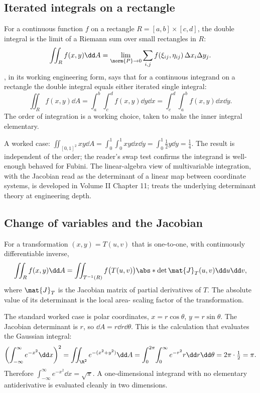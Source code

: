 \subsection{Iterated integrals on a rectangle}

For a continuous function $f$ on a rectangle $R = [a,b] \times
[c,d]$, the double integral is the limit of a Riemann sum over
small rectangles in $R$:
\[
\iint_{R} f(x,y) \dd A = \lim_{\norm{P} \to 0} \sum_{i,j}
f(\xi_{ij}, \eta_{ij}) \, \Delta x_{i} \Delta y_{j}.
\]
, in its working engineering form, says
that for a continuous integrand on a rectangle the double integral
equals either iterated single integral:
\[
\iint_{R} f(x,y) \dd A = \int_{a}^{b}\!\int_{c}^{d} f(x,y) \dd y
\dd x = \int_{c}^{d}\!\int_{a}^{b} f(x,y) \dd x \dd y.
\]
The order of integration is a working choice, taken to make the
inner integral elementary.

A worked case: $\iint_{[0,1]^{2}} x y \dd A = \int_{0}^{1}\!\int_{0}^{1}
x y \dd x \dd y = \int_{0}^{1} \tfrac{1}{2} y \dd y = \tfrac{1}{4}$.
The result is independent of the order; the reader's swap test
confirms the integrand is well-enough behaved for Fubini. The
linear-algebra view of multivariable integration, with the Jacobian
read as the determinant of a linear map between coordinate systems,
is developed in Volume II Chapter 11; \textcite{text:strang2016}
treats the underlying determinant theory at engineering depth.

\subsection{Change of variables and the Jacobian}

For a transformation $(x, y) = T(u, v)$ that is one-to-one, with
continuously differentiable inverse,
\[
\iint_{R} f(x, y) \dd A = \iint_{T^{-1}(R)} f\bigl(T(u,v)\bigr)
\abs*{\det \mat{J}_{T}(u,v)} \dd u \dd v,
\]
where $\mat{J}_{T}$ is the Jacobian matrix of partial derivatives
of $T$. The absolute value of its determinant is the local area-
scaling factor of the transformation.

The standard worked case is polar coordinates, $x = r \cos\theta$,
$y = r \sin\theta$. The Jacobian determinant is $r$, so $\dd A =
r \dd r \dd \theta$. This is the calculation that evaluates the
Gaussian integral:
\[
\left(\int_{-\infty}^{\infty} e^{-x^{2}} \dd x\right)^{2} =
\iint_{\R^{2}} e^{-(x^{2} + y^{2})} \dd A =
\int_{0}^{2\pi}\!\int_{0}^{\infty} e^{-r^{2}} r \dd r \dd \theta =
2\pi \cdot \tfrac{1}{2} = \pi.
\]
Therefore $\int_{-\infty}^{\infty} e^{-x^{2}} \dd x = \sqrt{\pi}$. A
one-dimensional integrand with no elementary antiderivative is
evaluated cleanly in two dimensions.

